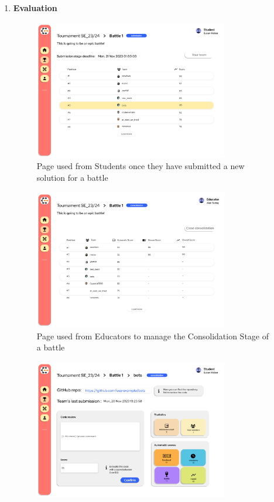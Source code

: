 \begin{enumerate}[label=\textbf{F\arabic*)}]
    \item \textbf{Evaluation}\\
    \begin{figure}[H]
        \centering
        \includegraphics[width=0.8\textwidth]{Mockups/14_student_battle_submission.png}
        \caption{Page used from Students once they have submitted a new solution for a battle}
    \end{figure}
    \begin{figure}[H]
        \centering
        \includegraphics[width=0.8\textwidth]{Mockups/16_educator_battle_consolidation.png}
        \caption{Page used from Educators to manage the Consolidation Stage of a battle}
    \end{figure}
    \begin{figure}[H]
        \centering
        \includegraphics[width=0.8\textwidth]{Mockups/17_educator_manual.png}

\end{figure}
\end{enumerate}
